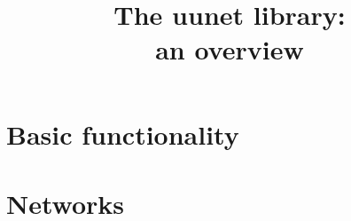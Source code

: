 \documentclass[11pt,a5paper,footinclude=true,headinclude=true]{scrbook} %
\title{The uunet library:\\an overview}
\theoremstyle{definition}
\begin{document}
	
	\maketitle
	
	\tableofcontents 


\cleardoublepage



\cleardoublepage\part{Basic functionality}




    
\cleardoublepage\part{Networks}
\label{part:networks}




    












%	

    
\end{document}
